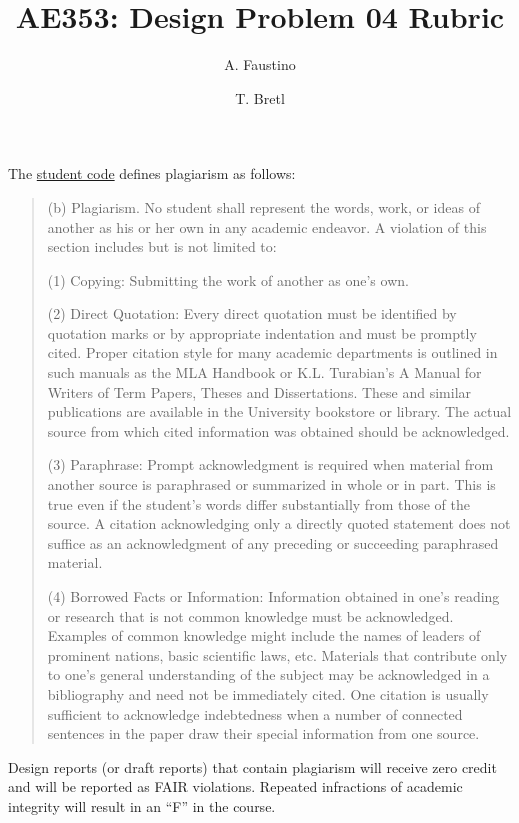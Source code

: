 \documentclass[12pt]{article}
\title{AE353: Design Problem 04 Rubric}
\author{A. Faustino \and T. Bretl}
\begin{document}
\maketitle

\begin{framed}
\noindent
The \href{http://studentcode.illinois.edu/article1_part4_1-402.html}{student code} defines plagiarism as follows:
	\begin{quote}
		(b) Plagiarism. No student shall represent the words, work, or ideas of another as his or her own in any academic endeavor. A violation of this section includes but is not limited to:
		
		(1)	Copying: Submitting the work of another as one's own. 
		
		(2)	Direct Quotation: Every direct quotation must be identified by quotation marks or by appropriate indentation and must be promptly cited. Proper citation style for many academic departments is outlined in such manuals as the MLA Handbook or K.L. Turabian's A Manual for Writers of Term Papers, Theses and Dissertations. These and similar publications are available in the University bookstore or library. The actual source from which cited information was obtained should be acknowledged.
		
		(3)	Paraphrase: Prompt acknowledgment is required when material from another source is paraphrased or summarized in whole or in part. This is true even if the student's words differ substantially from those of the source. A citation acknowledging only a directly quoted statement does not suffice as an acknowledgment of any preceding or succeeding paraphrased material. 
		
		(4)	Borrowed Facts or Information: Information obtained in one's reading or research that is not common knowledge must be acknowledged. Examples of common knowledge might include the names of leaders of prominent nations, basic scientific laws, etc. Materials that contribute only to one's general understanding of the subject may be acknowledged in a bibliography and need not be immediately cited. One citation is usually sufficient to acknowledge indebtedness when a number of connected sentences in the paper draw their special information from one source.
	\end{quote}
	Design reports (or draft reports) that contain plagiarism will receive zero credit and will be reported as FAIR violations. Repeated infractions of academic integrity will result in an ``F'' in the course.
\end{framed}
\clearpage
\end{document}
